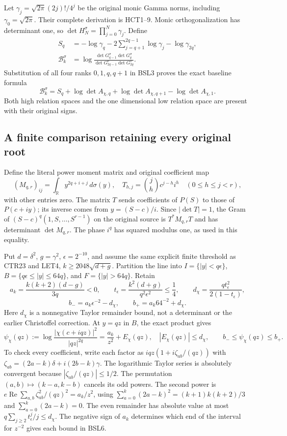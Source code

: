 \documentclass[11pt,a4paper]{article}
\begin{document}
Let $\gamma_j=\sqrt{2\pi}(2j)!/4^j$ be the original monic Gamma
norms, including $\gamma_0=\sqrt{2\pi}$. Their complete derivation is
HCT1--9. Monic orthogonalization has determinant one, so
$\det H_N^\sigma=\prod_{j=0}^N\gamma_j$. Define
\[
 \begin{split}
 S_q&=-\log\gamma_q-2\sum_{j=q+1}^{2q-1}\log\gamma_j
                      -\log\gamma_{2q},\\
 \mathcal B_k^\sigma
 &=\log\frac{\det G_{q-1}^\sigma\det G_q^\sigma}
                   {\det G_{2q-1}^\sigma\det G_{2q}^\sigma}.
 \end{split}
\]
Substitution of all four ranks $0,1,q,q+1$ in BSL3 proves the exact
baseline formula
\[
 \boxed{\mathcal B_k^\sigma
 =S_q+\log\det A_{\chi,q}+\log\det A_{\chi,q+1}
                         -\log\det A_{\chi,1}.}
 \tag{BSL4}
\]
Both high relation spaces and the one dimensional low relation space
are present with their original signs.

\subsection{A finite comparison retaining every original root}
Define the literal power moment matrix and original coefficient map
\[
 (M_{q,r})_{ij}=\int_{\mathbb R}y^{2q+i+j}\,d\sigma(y),\quad
 T_{h,j}=\binom jh c^{j-h}i^h\quad(0\leq h\leq j<r),
 \tag{BSL5}
\]
with other entries zero. The matrix $T$ sends coefficients of $P(S)$
to those of $P(c+iy)$; its inverse comes from $y=(S-c)/i$.
Since $|\det T|=1$, the Gram of
$(S-c)^q(1,S,\ldots,S^{r-1})$ on the original source is
$T^*M_{q,r}T$ and has determinant $\det M_{q,r}$.
The phase $i^q$ has squared modulus one, as used in this equality.

Put $d=\delta^2$, $g=\gamma^2$, $\epsilon=2^{-10}$, and assume
the same explicit finite threshold as CTR23 and LET4,
$k\geq2048\sqrt{d+g}$. Partition the line into
$I=\{|y|<q\epsilon\}$, $B=\{q\epsilon\leq|y|\leq64q\}$,
and $F=\{|y|>64q\}$. Retain
\[
 a_k=\frac{k(k+2)(d-g)}{3q}<0,\qquad
 t_\epsilon=\frac{k^2(d+g)}{q^2\epsilon^2}\leq\frac14,\qquad
 d_\chi=\frac{qt_\epsilon^2}{2(1-t_\epsilon)},
\]
\[
 b_- =a_k\epsilon^{-2}-d_\chi,\qquad
 b_+ =a_k64^{-2}+d_\chi.
 \tag{BSL6}
\]
Here $d_\chi$ is a nonnegative Taylor remainder bound, not a
determinant or the earlier Christoffel correction. At $y=qz$ in $B$,
the exact product gives
\[
 \psi_\chi(qz):=\log\frac{|\chi(c+iqz)|^2}{|qz|^{2q}}
       =\frac{a_k}{z^2}+E_\chi(qz),\quad |E_\chi(qz)|\leq d_\chi,
 \qquad b_-\leq\psi_\chi(qz)\leq b_+.
 \tag{BSL7}
\]
To check every coefficient, write each factor as
$iqz(1+i\zeta_{ab}/(qz))$ with
$\zeta_{ab}=(2a-k)\delta+i(2b-k)\gamma$. The logarithmic Taylor
series is absolutely convergent because $|\zeta_{ab}/(qz)|\leq1/2$.
The permutation $(a,b)\mapsto(k-a,k-b)$ cancels its odd powers.
The second power is
$e\operatorname{Re}\sum_{a,b}\zeta_{ab}^2/(qz)^2=a_k/z^2$,
using $\sum_{a=0}^k(2a-k)^2=(k+1)k(k+2)/3$ and
$\sum_{a=0}^k(2a-k)=0$. The even remainder has absolute value at
most $q\sum_{j\geq2}t_\epsilon^j/j\leq d_\chi$.
The negative sign of $a_k$ determines which end of the interval for
$z^{-2}$ gives each bound in BSL6.
\end{document}
